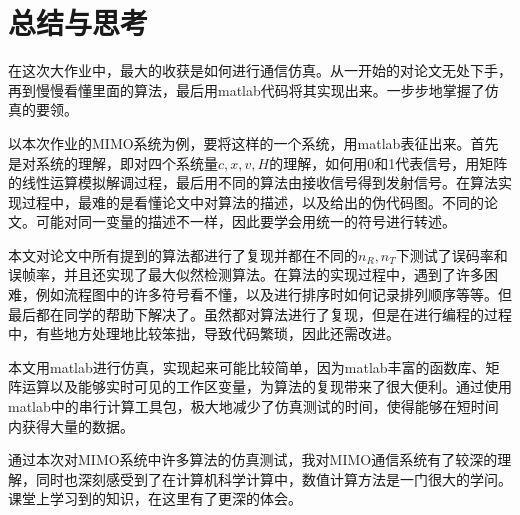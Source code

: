 \documentclass[a4paper,12pt]{article}
\begin{document}
	\section{总结与思考}
	在这次大作业中，最大的收获是如何进行通信仿真。从一开始的对论文无处下手，再到慢慢看懂里面的算法，最后用matlab代码将其实现出来。一步步地掌握了仿真的要领。\par 
	以本次作业的MIMO系统为例，要将这样的一个系统，用matlab表征出来。首先是对系统的理解，即对四个系统量$c,x,v,H$的理解，如何用0和1代表信号，用矩阵的线性运算模拟解调过程，最后用不同的算法由接收信号得到发射信号。在算法实现过程中，最难的是看懂论文中对算法的描述，以及给出的伪代码图。不同的论文。可能对同一变量的描述不一样，因此要学会用统一的符号进行转述。\par 
	本文对论文中所有提到的算法都进行了复现并都在不同的$n_R,n_T$下测试了误码率和误帧率，并且还实现了最大似然检测算法。在算法的实现过程中，遇到了许多困难，例如流程图中的许多符号看不懂，以及进行排序时如何记录排列顺序等等。但最后都在同学的帮助下解决了。虽然都对算法进行了复现，但是在进行编程的过程中，有些地方处理地比较笨拙，导致代码繁琐，因此还需改进。\par 
	本文用matlab进行仿真，实现起来可能比较简单，因为matlab丰富的函数库、矩阵运算以及能够实时可见的工作区变量，为算法的复现带来了很大便利。通过使用matlab中的串行计算工具包，极大地减少了仿真测试的时间，使得能够在短时间内获得大量的数据。\par 
	通过本次对MIMO系统中许多算法的仿真测试，我对MIMO通信系统有了较深的理解，同时也深刻感受到了在计算机科学计算中，数值计算方法是一门很大的学问。课堂上学习到的知识，在这里有了更深的体会。
\end{document}

